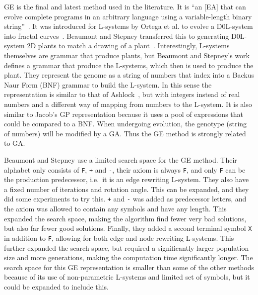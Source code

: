 \gls{GE} is the final and latest method used in the literature.
It is ``an [\gls{EA}] that can evolve complete programs in an arbitrary language using a variable-length binary string''~\cite{2003Oneil}.
It was introduced for \glspl{L-system} by Ortega et al. to evolve a D0L-system into fractal curves~\cite{2003Ortega}.
Beaumont and Stepney transferred this to generating D0L-system 2D plants to match a drawing of a plant~\cite{2009Beaumont}.
Interestingly, \glspl{L-system} themselves are grammar that produce plants, but Beaumont and Stepney's work defines a grammar that produce the \glspl{L-system}, which then is used to produce the plant.
They represent the genome as a string of numbers that index into a Backus Naur Form (BNF) grammar to build the \gls{L-system}.
In this sense the representation is similar to that of Ashlock~\cite{2006Ashlock}, but with integers instead of real numbers and a different way of mapping from numbers to the \gls{L-system}.
It is also similar to Jacob's \gls{GP} representation because it uses a pool of expressions that could be compared to a BNF.
When undergoing evolution, the genotype (string of numbers) will be modified by a \gls{GA}.
Thus the \gls{GE} method is strongly related to \gls{GA}.

Beaumont and Stepney use a limited search space for the \gls{GE} method.
Their alphabet only consists of \texttt{F}, \texttt{+} and \texttt{-}, their axiom is always \texttt{F}, and only \texttt{F} can be the production predecessor, i.e.\ it is an edge rewriting \gls{L-system}.
They also have a fixed number of iterations and rotation angle.
This can be expanded, and they did some experiments to try this.
\texttt{+} and \texttt{-} was added as predecessor letters, and the axiom was allowed to contain any symbols and have any length.
This expanded the search space, making the algorithm find fewer very bad solutions, but also far fewer good solutions.
Finally, they added a second terminal symbol \texttt{X} in addition to \texttt{F}, allowing for both edge and node rewriting \glspl{L-system}.
This further expanded the search space, but required a significantly larger population size and more generations, making the computation time significantly longer.
The search space for this \gls{GE} representation is smaller than some of the other methods because of its use of non-parametric \glspl{L-system} and limited set of symbols, but it could be expanded to include this.

